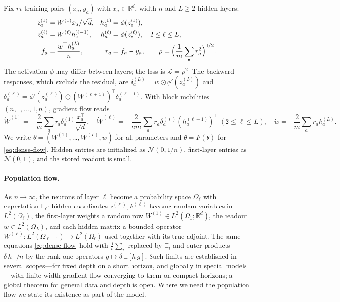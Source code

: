 \documentclass[11pt]{article}
\theoremstyle{definition}
\theoremstyle{remark}
\newcommand{\R}{\mathbb{R}}
\newcommand{\E}{\mathbb{E}}
\newcommand{\cL}{\mathcal{L}}
\newcommand{\od}{\mathbin{\odot}}
\begin{document}
Fix $m$ training pairs $(x_a,y_a)$ with $x_a\in\R^d$, width $n$ and $L\ge2$
hidden layers:
\begin{align}
 z_a^{(1)}&=W^{(1)}x_a/\sqrt d,& h_a^{(1)}&=\phi(z_a^{(1)}),\nonumber\\
 z_a^{(\ell)}&=W^{(\ell)}h_a^{(\ell-1)},&
 h_a^{(\ell)}&=\phi(z_a^{(\ell)}),\quad 2\le\ell\le L,\\
 f_a&=\frac{w^\top h_a^{(L)}}{n},& r_a&=f_a-y_a,\qquad
 \rho=\Bigl(\frac1m\sum_a r_a^2\Bigr)^{1/2}.\nonumber
\end{align}
The activation $\phi$ may differ between layers; the loss is $\cL=\rho^2$.  The
backward responses, which exclude the residual, are
$\delta_a^{(L)}=w\od\phi'(z_a^{(L)})$ and
$\delta_a^{(\ell)}=\phi'(z_a^{(\ell)})\od(W^{(\ell+1)})^\top\delta_a^{(\ell+1)}$.
With block mobilities $(n,1,\ldots,1,n)$, gradient flow reads
\begin{equation}
 \dot W^{(1)}=-\frac2m\sum_a r_a\delta_a^{(1)}\frac{x_a^\top}{\sqrt d},\quad
 \dot W^{(\ell)}=-\frac{2}{nm}\sum_a r_a\delta_a^{(\ell)}
 (h_a^{(\ell-1)})^\top\ (2\le\ell\le L),\quad
 \dot w=-\frac2m\sum_a r_a h_a^{(L)}.\label{eq:dense-flow}
\end{equation}
We write $\theta=(W^{(1)},\ldots,W^{(L)},w)$ for all parameters and
$\dot\theta=F(\theta)$ for \eqref{eq:dense-flow}.  Hidden entries are initialized
as $\mathcal N(0,1/n)$, first-layer entries as $\mathcal N(0,1)$, and the stored
readout is small.

\paragraph{Population flow.}
As $n\to\infty$, the neurons of layer $\ell$ become a probability space
$\Omega_\ell$ with expectation $\E_\ell$: hidden coordinates $z^{(\ell)},h^{(\ell)}$
become random variables in $L^2(\Omega_\ell)$, the first-layer weights a random
row $W^{(1)}\in L^2(\Omega_1;\R^d)$, the readout $w\in L^2(\Omega_L)$, and each
hidden matrix a bounded operator $W^{(\ell)}:L^2(\Omega_{\ell-1})\to L^2(\Omega_\ell)$
used together with its true adjoint.  The same equations \eqref{eq:dense-flow}
hold with $\frac1n\sum_i$ replaced by $\E_\ell$ and outer products
$\delta\,h^\top/n$ by the rank-one operators $g\mapsto\delta\,\E[h\,g]$.  Such
limits are established in several scopes---for fixed depth on a short horizon,
and globally in special models---with finite-width gradient flow converging to
them on compact horizons; a global theorem for general data and depth is open.
Where we need the population flow we state its existence as part of the model.
\end{document}
